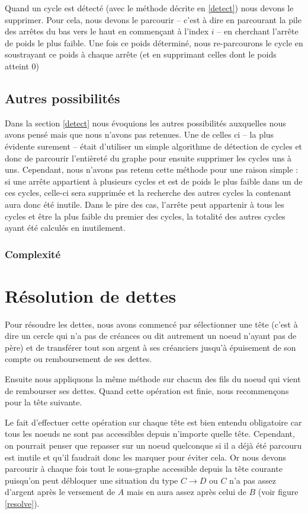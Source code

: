 \documentclass[12pt, oneside]{article}
\begin{document}
Quand un cycle est détecté (avec le méthode décrite en \ref{detect}) nous devons le supprimer. Pour cela, nous devons le parcourir -- c'est à dire en parcourant la pile des arrêtes du bas vers le haut en commençant à l'index $i$ -- en cherchant l'arrête de poids le plus faible. Une fois ce poids déterminé, nous re-parcourons le cycle en soustrayant ce poids à chaque arrête (et en supprimant celles dont le poids atteint 0)



\subsection{Autres possibilités}
\label{others}

Dans la section \ref{detect} nous évoquions les autres possibilités auxquelles nous avons pensé mais que nous n'avons pas retenues. Une de celles ci -- la plus évidente surement -- était d'utiliser un simple algorithme de détection de cycles et donc de parcourir l'entièreté du graphe pour ensuite supprimer les cycles uns à uns. Cependant, nous n'avons pas retenu cette méthode pour une raison simple : si une arrête appartient à plusieurs cycles et est de poids le plus faible dans un de ces cycles, celle-ci sera supprimée et la recherche des autres cycles la contenant aura donc été inutile. Dans le pire des cas, l'arrête peut appartenir à tous les cycles et être la plus faible du premier des cycles, la totalité des autres cycles ayant été calculés en inutilement.


\subsubsection{Complexité}


\section{Résolution de dettes}
Pour résoudre les dettes, nous avons commencé par sélectionner une tête (c'est à dire un cercle qui n'a pas de créances ou dit autrement un noeud n'ayant pas de père) et de transférer tout son argent à ses créanciers jusqu'à épuisement de son compte ou remboursement de ses dettes.

Ensuite nous appliquons la même méthode sur chacun des fils du noeud qui vient de rembourser ses dettes. Quand cette opération est finie, nous recommençons pour la tête suivante.

Le fait d'effectuer cette opération sur chaque tête est bien entendu obligatoire car tous les noeuds ne sont pas accessibles depuis n'importe quelle tête. Cependant, on pourrait penser que repasser sur un noeud quelconque si il a déjà été parcouru est inutile et qu'il faudrait donc les marquer pour éviter cela. Or nous devons parcourir à chaque fois tout le sous-graphe accessible depuis la tête courante puisqu'on peut débloquer une situation du type $C \rightarrow D$ ou $C$ n'a pas assez d'argent après le versement de $A$ mais en aura assez après celui de $B$ (voir figure \ref{resolve}).
\end{document}
